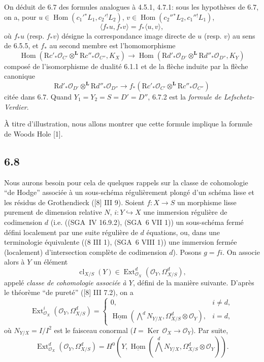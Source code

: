 \documentclass[11pt]{article}
\providecommand{\cO}{\mathcal{O}}
\DeclareMathOperator{\Hom}{Hom}
\DeclareMathOperator{\Ext}{Ext}
\newcommand{\R}{\mathrm{R}}\newcommand{\RHomCore}{\mathrm{RHom}}
\providecommand{\Ker}{\operatorname{Ker}}
\providecommand{\cl}{\operatorname{cl}}
\providecommand{\Hom}{\operatorname{Hom}}
\providecommand{\Ker}{\operatorname{Ker}}
\providecommand{\Ker}{\operatorname{Ker}}
\providecommand{\R}{\mathrm R}
\providecommand{\cl}{\operatorname{cl}}
\providecommand{\Hom}{\operatorname{Hom}}
\providecommand{\cl}{\operatorname{cl}}
\begin{document}
On déduit de 6.7 des formules analogues à 4.5.1, 4.7.1: sous les hypothèses de 6.7, on a, pour $u\in\Hom(c_1'{}^*L_1,c_2'{}^!L_2)$, $v\in\Hom(c_2''{}^*L_2,c_1''{}^!L_1)$,
\begin{equation}
\tag{6.7.2}
\langle f_*u,f_*v\rangle=f_*\langle u,v\rangle,
\end{equation}
où $f_*u$ (resp. $f_*v$) désigne la correspondance image directe de $u$ (resp. $v$) au sens de 6.5.5, et $f_*$ au second membre est l'homomorphisme
\begin{equation}
\tag{6.7.3}
\Hom(\R c'_*\cO_{C'}\otimes^{\mathbf L}\R c''_*\cO_{C''},K_X)
\longrightarrow
\Hom(\R d'_*\cO_{D'}\otimes^{\mathbf L}\R d''_*\cO_{D''},K_Y)
\end{equation}
composé de l'isomorphisme de dualité 6.1.1 et de la flèche induite par la flèche canonique
\[
\R d'_*\cO_{D'}\otimes^{\mathbf L}\R d''_*\cO_{D''}\longrightarrow f_*(\R c'_*\cO_{C'}\otimes^{\mathbf L}\R c''_*\cO_{C''})
\]
citée dans 6.7. Quand $Y_1=Y_2=S=D'=D''$, 6.7.2 est la \emph{formule de Lefschetz-Verdier}.

À titre d'illustration, nous allons montrer que cette formule implique la formule de Woods Hole [1].

\subsection*{6.8}
Nous aurons besoin pour cela de quelques rappels sur la classe de cohomologie ``de Hodge'' associée à un sous-schéma régulièrement plongé d'un schéma lisse et les résidus de Grothendieck ([8] III 9). Soient $f:X\to S$ un morphisme lisse purement de dimension relative $N$, $i:Y\hookrightarrow X$ une immersion régulière de codimension $d$ (i.e. ((SGA~IV 16.9.2), (SGA~6 VII 1)) un sous-schéma fermé défini localement par une suite régulière de $d$ équations, ou, dans une terminologie équivalente ((8 III 1), (SGA~6 VIII 1)) une immersion fermée (localement) d'intersection complète de codimension $d$). Posons $g=fi$. On associe alors à $Y$ un élément
\begin{equation}
\tag{6.8.1}
\cl_{X/S}(Y)\in\Ext^d_{\cO_X}(\cO_Y,\Omega^d_{X/S}),
\end{equation}
appelé \emph{classe de cohomologie associée à $Y$}, défini de la manière suivante. D'après le théorème ``de pureté'' ([8] III 7.2), on a
\begin{equation}
\tag{6.8.2}
\Ext^i_{\cO_X}(\cO_Y,\Omega^d_{X/S})=
\begin{cases}
0,& i\ne d,\\
\underline{\Hom}(\bigwedge^d N_{Y/X},\Omega^d_{X/S}\otimes\cO_Y),& i=d,
\end{cases}
\end{equation}
où $N_{Y/X}=I/I^2$ est le faisceau conormal ($I=\Ker\,\cO_X\to\cO_Y$). Par suite,
\begin{equation}
\tag{6.8.3}
\Ext^d_{\cO_X}(\cO_Y,\Omega^d_{X/S})=H^0(Y,\underline{\Hom}(\bigwedge^dN_{Y/X},\Omega^d_{X/S}\otimes\cO_Y)).
\end{equation}
\end{document}
